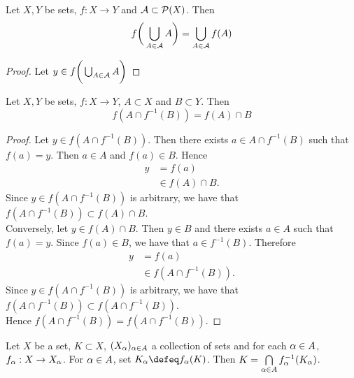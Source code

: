 \documentclass{book}
\begin{document}
		\begin{ex} 
			Let $X, Y$ be sets, $f:X \rightarrow Y$ and $\mathcal{A} \subset \mathcal{P}(X)$. Then 
			$$f\bigg( \bigcup_{A \in \mathcal{A}} A\bigg) = \bigcup_{A \in \mathcal{A}} f(A)$$ 
		\end{ex}
	
		\begin{proof}
			Let $y \in f\bigg( \bigcup_{A \in \mathcal{A}} A \bigg)$
		\end{proof}
	
		\begin{ex} 
			Let $X, Y$ be sets, $f:X \rightarrow Y$, $A \subset X$ and $B \subset Y$. Then 
			$$f(A \cap f^{-1}(B)) = f(A) \cap B$$ 
		\end{ex}
		
		\begin{proof}
			Let $y \in f(A \cap f^{-1}(B))$. Then there exists $a \in A \cap f^{-1}(B)$ such that $f(a) = y$. Then $a \in A$ and $f(a) \in B$. Hence 
			\begin{align*}
				y
				& = f(a) \\
				& \in f(A) \cap B.
			\end{align*}
			Since $y \in f(A \cap f^{-1}(B))$ is arbitrary, we have that $f(A \cap f^{-1}(B)) \subset f(A) \cap B$. \\
			Conversely, let $y \in f(A) \cap B$. Then $y \in B$ and there exists $a \in A$ such that $f(a) = y$. Since $f(a) \in B$, we have that $a \in f^{-1}(B)$. Therefore 
			\begin{align*}
				y
				& = f(a) \\
				& \in f(A \cap f^{-1}(B)).
			\end{align*} 
			Since $y \in f(A \cap f^{-1}(B))$ is arbitrary, we have that $f(A \cap f^{-1}(B)) \subset f(A \cap f^{-1}(B))$. \\
			Hence $f(A \cap f^{-1}(B)) = f(A \cap f^{-1}(B))$. 
		\end{proof}
	
	
	\begin{ex} 
		Let $X$ be a set, $K \subset X$, $(X_\alpha)_{\alpha \in A}$ a collection of sets and for each $\alpha \in A$, $f_{\alpha}: X \rightarrow X_{\alpha}$. For $\alpha \in A$, set $K_{\al} \defeq f_{\al}(K)$. Then $K = \bigcap\limits_{\alpha \in A} f_{\alpha}^{-1}(K_{\alpha})$.
	\end{ex}
\end{document}
